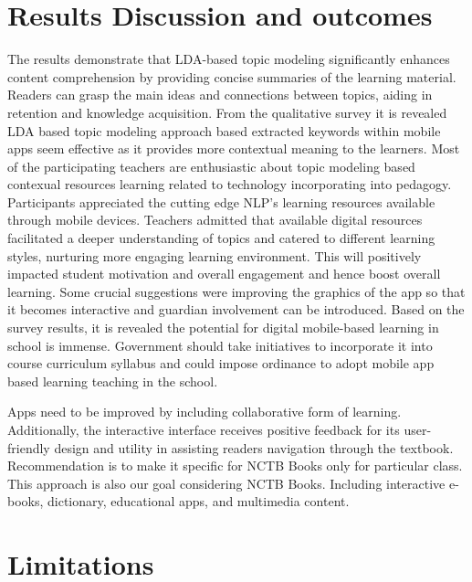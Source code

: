 \documentclass[sn-mathphys,Numbered]{sn-jnl}%
\theoremstyle{thmstyleone}%
\theoremstyle{thmstyletwo}%
\theoremstyle{thmstylethree}%
\begin{document}
\section{Results Discussion and outcomes}

The results demonstrate that LDA-based topic modeling significantly
enhances content comprehension by providing concise summaries of the
learning material. Readers can grasp the main ideas and connections
between topics, aiding in retention and knowledge acquisition. From the
qualitative survey it is revealed LDA based topic modeling approach
based extracted keywords within mobile apps seem effective as it
provides more contextual meaning to the learners. Most of the
participating teachers are enthusiastic about topic modeling based
contexual resources learning related to technology incorporating into
pedagogy. Participants appreciated the cutting edge NLP's learning
resources available through mobile devices. Teachers admitted that
available digital resources facilitated a deeper understanding of topics
and catered to different learning styles, nurturing more engaging
learning environment. This will positively impacted student motivation
and overall engagement and hence boost overall learning. Some crucial
suggestions were improving the graphics of the app so that it becomes
interactive and guardian involvement can be introduced. Based on the
survey results, it is revealed the potential for digital mobile-based
learning in school is immense. Government should take initiatives to
incorporate it into course curriculum syllabus and could impose
ordinance to adopt mobile app based learning teaching in the school.

Apps need to be improved by including collaborative form of learning.
Additionally, the interactive interface receives positive feedback for
its user-friendly design and utility in assisting
readers\textquotesingle{} navigation through the textbook.
Recommendation is to make it specific for NCTB Books only for particular
class. This approach is also our goal considering NCTB Books. Including
interactive e-books, dictionary, educational apps, and multimedia
content.

\section{Limitations}
\end{document}
